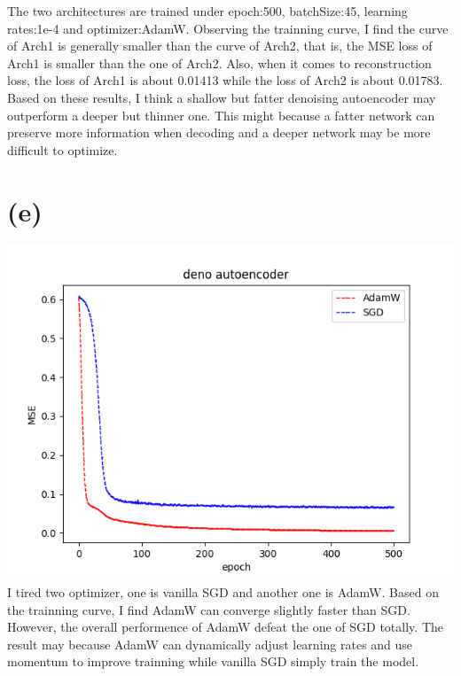 \documentclass[12pt,a4paper]{article}
\begin{document}
The two architectures are trained under epoch:500, batchSize:45, learning rates:1e-4 and
optimizer:AdamW. Observing the trainning curve, I find the curve of Arch1 is generally smaller than the curve of Arch2, that is,
the MSE loss of Arch1 is smaller than the one of Arch2. Also, when it comes to reconstruction loss, the loss of Arch1 is about 0.01413 while the loss of
Arch2 is about 0.01783. Based on these results, I think a shallow but fatter denoising autoencoder may outperform a deeper but thinner one. This might because
a fatter network can preserve more information when decoding and a deeper network may be more difficult to optimize.
\newpage
\section*{(e)}
\includegraphics{Figure5.png}\\
I tired two optimizer, one is vanilla SGD and another one is AdamW.
Based on the trainning curve, I find AdamW can converge slightly faster than SGD. 
However, the overall performence of AdamW defeat the one of SGD totally. 
The result may because AdamW can dynamically adjust learning rates and use momentum to improve trainning while vanilla SGD simply train the model.
\end{document}
